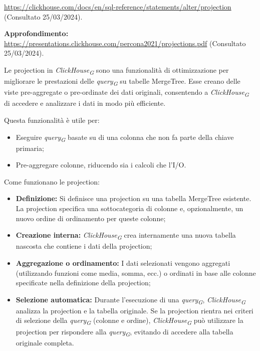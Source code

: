 \url{https://clickhouse.com/docs/en/sql-reference/statements/alter/projection} (Consultato 25/03/2024).

\textbf{Approfondimento:} \url{https://presentations.clickhouse.com/percona2021/projections.pdf} (Consultato 25/03/2024).

Le projection in \textit{ClickHouse}\textsubscript{\textit{G}} sono una funzionalità di ottimizzazione per migliorare le prestazioni delle \textit{query}\textsubscript{\textit{G}} su tabelle MergeTree. Esse creano delle viste pre-aggregate o pre-ordinate dei dati originali, consentendo a \textit{ClickHouse}\textsubscript{\textit{G}} di accedere e analizzare i dati in modo più efficiente.

Questa funzionalità è utile per:

\begin{itemize}
    \item Eseguire \textit{query}\textsubscript{\textit{G}} basate su di una colonna che non fa parte della chiave primaria;
    \item Pre-aggregare colonne, riducendo sia i calcoli che l'I/O.
\end{itemize}

Come funzionano le projection:
\begin{itemize}
	\item \textbf{Definizione:} Si definisce una projection su una tabella MergeTree esistente. La projection specifica una sottocategoria di colonne e, opzionalmente, un nuovo ordine di ordinamento per queste colonne;
	\item \textbf{Creazione interna:} \textit{ClickHouse}\textsubscript{\textit{G}} crea internamente una nuova tabella nascosta che contiene i dati della projection;
	\item \textbf{Aggregazione o ordinamento:} I dati selezionati vengono aggregati (utilizzando funzioni come media, somma, ecc.) o ordinati in base alle colonne specificate nella definizione della projection;
	\item \textbf{Selezione automatica:} Durante l'esecuzione di una \textit{query}\textsubscript{\textit{G}}, \textit{ClickHouse}\textsubscript{\textit{G}} analizza la projection e la tabella originale. Se la projection rientra nei criteri di selezione della \textit{query}\textsubscript{\textit{G}} (colonne e ordine), \textit{ClickHouse}\textsubscript{\textit{G}} può utilizzare la projection per rispondere alla \textit{query}\textsubscript{\textit{G}}, evitando di accedere alla tabella originale completa.
\end{itemize}

